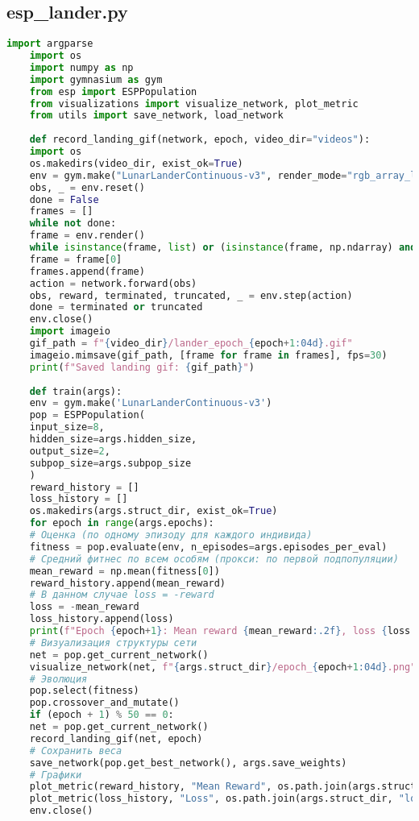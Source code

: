 \documentclass[a4paper,12pt]{article}
\begin{document}
\subsection*{esp\_lander.py}
\begin{lstlisting}[language=Python, caption={esp\_lander.py}]
	import argparse
	import os
	import numpy as np
	import gymnasium as gym
	from esp import ESPPopulation
	from visualizations import visualize_network, plot_metric
	from utils import save_network, load_network
	
	def record_landing_gif(network, epoch, video_dir="videos"):
	import os
	os.makedirs(video_dir, exist_ok=True)
	env = gym.make("LunarLanderContinuous-v3", render_mode="rgb_array_list")  # для новых gymnasium
	obs, _ = env.reset()
	done = False
	frames = []
	while not done:
	frame = env.render()
	while isinstance(frame, list) or (isinstance(frame, np.ndarray) and frame.ndim > 3):
	frame = frame[0]
	frames.append(frame)
	action = network.forward(obs)
	obs, reward, terminated, truncated, _ = env.step(action)
	done = terminated or truncated
	env.close()
	import imageio
	gif_path = f"{video_dir}/lander_epoch_{epoch+1:04d}.gif"
	imageio.mimsave(gif_path, [frame for frame in frames], fps=30)
	print(f"Saved landing gif: {gif_path}")
	
	def train(args):
	env = gym.make('LunarLanderContinuous-v3')
	pop = ESPPopulation(
	input_size=8,
	hidden_size=args.hidden_size,
	output_size=2,
	subpop_size=args.subpop_size
	)
	reward_history = []
	loss_history = []
	os.makedirs(args.struct_dir, exist_ok=True)
	for epoch in range(args.epochs):
	# Оценка (по одному эпизоду для каждого индивида)
	fitness = pop.evaluate(env, n_episodes=args.episodes_per_eval)
	# Средний фитнес по всем особям (прокси: по первой подпопуляции)
	mean_reward = np.mean(fitness[0])
	reward_history.append(mean_reward)
	# В данном случае loss = -reward
	loss = -mean_reward
	loss_history.append(loss)
	print(f"Epoch {epoch+1}: Mean reward {mean_reward:.2f}, loss {loss:.2f}")
	# Визуализация структуры сети
	net = pop.get_current_network()
	visualize_network(net, f"{args.struct_dir}/epoch_{epoch+1:04d}.png")
	# Эволюция
	pop.select(fitness)
	pop.crossover_and_mutate()
	if (epoch + 1) % 50 == 0:
	net = pop.get_current_network()
	record_landing_gif(net, epoch)
	# Сохранить веса
	save_network(pop.get_best_network(), args.save_weights)
	# Графики
	plot_metric(reward_history, "Mean Reward", os.path.join(args.struct_dir, "reward_curve.png"))
	plot_metric(loss_history, "Loss", os.path.join(args.struct_dir, "loss_curve.png"))
	env.close()
	

\end{lstlisting}
\end{document}
